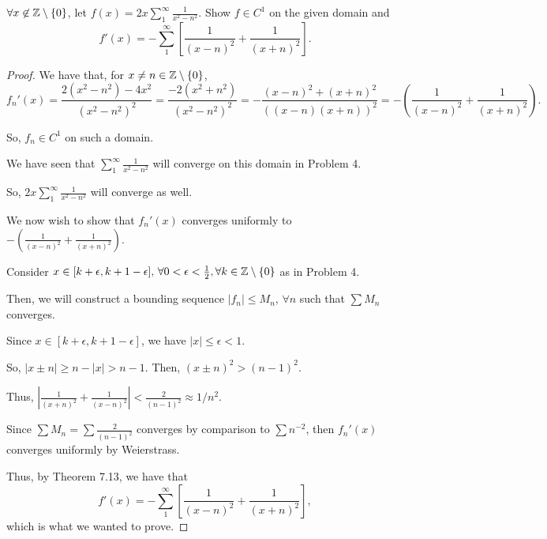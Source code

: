\documentclass[../hw3]{subfiles}
\begin{document}
\begin{problem}
$\forall x \not\in \mathbb{Z}\setminus \{0\}$, let $f(x)=2x \sum_{1}^{\infty} \frac{1}{x^2-n^2}$.
Show $f\in C^1$ on the given domain and \[
	f'(x)=-\sum_{1}^{\infty} \left[ \frac{1}{(x-n)^2}+\frac{1}{(x+n)^2} \right]
	.\]
\end{problem}
\begin{proof}
	We have that, for $x \neq n \in \mathbb{Z}\setminus \{0\}$, \[
		f_n'(x)=\frac{2(x^2 - n^2) - 4x^2}{(x^2 - n^2)^2}=\frac{-2(x^2  + n^2)}{(x^2 - n^2)^2}=-\frac{(x-n)^2 + (x+n)^2}{((x-n)(x+n))^2}=-\left( \frac{1}{(x-n)^2} + \frac{1}{(x+n)^2} \right)
		.\]

	So, $f_n \in  C^1$ on such a domain.

	We have seen that $\sum_{1}^{\infty} \frac{1}{x^2 - n^2}$ will converge on this domain in Problem 4.

	So, $2x \sum_{1}^{\infty} \frac{1}{x^2 - n^2}$ will converge as well.

	We now wish to show that  $f_n'(x)$ converges uniformly to $-\left( \frac{1}{(x-n)^2} + \frac{1}{(x+n)^2} \right)$.

	Consider $x \in [k+\epsilon, k+1-\epsilon],\,  \forall 0<\epsilon<\frac{1}{2}, \forall k\in \mathbb{Z}\setminus \{0\}$ as in Problem 4.

	Then, we will construct a bounding sequence $|f_n|\le M_n,\,  \forall n$ such that $\sum M_n$ converges.

	Since $x \in [k+\epsilon, k+1-\epsilon]$, we have $|x|\le \epsilon < 1$.

	So, $|x \pm n| \ge n - |x| > n - 1$. Then, $(x \pm n)^2 > (n-1)^2$.

	Thus, $\left|\frac{1}{(x + n)^2} + \frac{1}{(x-n)^2}\right| < \frac{2}{(n-1)^2}\approx 1 / n^2$.

	Since $\sum M_n = \sum \frac{2}{(n-1)^2}$ converges by comparison to $\sum n^{-2}$, then $f_n'(x)$ converges uniformly by Weierstrass.

	Thus, by Theorem 7.13, we have that \[
		f'(x)=-\sum_{1}^{\infty} \left[ \frac{1}{(x-n)^2}+\frac{1}{(x+n)^2} \right]
		,\] which is what we wanted to prove.
\end{proof}
\end{document}
